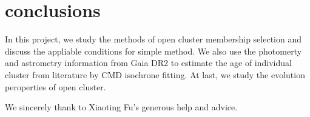 \documentclass[modern]{aastex63}
\begin{document}
\bigskip
\bigskip
\section{conclusions}\label{con}
In this project, we study the methods of open cluster membership selection and discuss the appliable conditions for simple method. We also use the photomerty and astrometry information from Gaia DR2 to estimate the age of individual cluster from literature by CMD isochrone fitting. At last, we study the evolution peroperties of open cluster.


\acknowledgments
We sincerely thank to Xiaoting Fu's generous help and advice.

\newpage
{}

\end{document}
